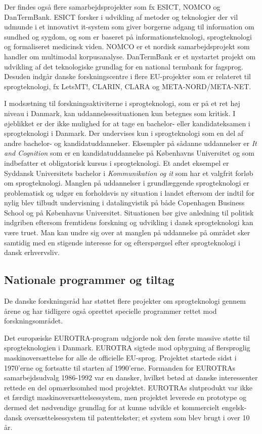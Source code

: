 \begin{multicols}{2}
Der findes \mbox{ogs\aa} flere samarbejdsprojekter som fx \mbox{ESICT}, NOMCO og DanTermBank. ESICT forsker i udvikling af metoder og teknologier der vil udmunde i et innovativt it-system som giver borgerne adgang til information om sundhed og sygdom, og som er baseret \mbox{p\aa} informationsteknologi, sprogteknologi og formali\-seret medicinsk viden. NOMCO er et nordisk samarbejdsprojekt som handler om multimodal korpusana\-lyse. DanTermBank er et nystartet projekt om udvikling af det teknologiske grundlag for en national termbank for fag\-sprog. Desuden indg\aa r danske forskningscentre i flere EU-projekter som er relateret til sprogtek\-nologi, fx LetsMT!, CLARIN, CLARA og META-NORD/META-NET.

I mods\ae tning til forskningsaktiviterne i sprogteknologi, som er \mbox{p\aa} et ret h\o j niveau i Danmark, kan uddannelsessituationen kun betegnes som kritisk. I \o jeblikket er der ikke mulighed for at tage en bachelor- eller kandidateksamen i sprogteknologi i Danmark.  Der undervises kun i sprogteknologi som en del af andre bachelor- og kandidatuddannelser. Eksempler \mbox{p\aa} s\aa danne uddannelser er {\it It and Cognition} som er en kandidatuddannelse \mbox{p\aa} K\o benhavns Universitet og som indbefatter et obligatorisk kursus i sprogteknologi. Et andet eksempel er Syddansk Universitets bachelor i {\it Kommunikation og it} som har et valgfrit forl\o b om sprogteknologi. Mang\-len \mbox{p\aa} uddannelser i grundl\ae ggende sprogteknologi er problematisk og udg\o r en forholdsvis ny situation i landet eftersom der indtil for nylig blev tilbudt undervisning i datalingvistik \mbox{p\aa} b\aa de Copenhagen Business School og \mbox{p\aa} K\o benhavns Universitet. Situationen b\o r give anledning til politisk indgriben eftersom fremtidens forskning og udvikling i dansk sprogteknologi kan v\ae re truet. Man kan undre sig over at manglen \mbox{p\aa} uddannelse \mbox{p\aa} omr\aa det sker samtidig med en stigende interesse for og eftersp\o rgsel efter sprogteknologi i dansk erhvervsliv.

\subsection{Nationale programmer og tiltag}

De danske forskningsr\aa d har st\o ttet flere projekter om sprogteknologi gennem \aa rene og har tidligere \mbox{ogs\aa} oprettet specielle programmer rettet mod forsknings\-omr\aa det.

Det europ\ae iske EUROTRA-program udgjorde nok den f\o rste massive st\o tte til sprogteknologien i Danmark.  EUROTRA sigtede mod opbygning af flersproglig maskinovers\ae ttelse for alle de officielle EU-sprog. Projektet startede sidst i 1970'erne og fortsatte til starten af 1990'erne. Formanden for EUROTRAs samarbejdsudvalg 1986-1992 var en dansker, hvilket bet\o d at danske interessenter rettede en del opm\ae rksomhed mod projektet. EUROTRAs slutprodukt var ikke et f\ae rdigt maskinovers\ae ttelsessystem, men projektet leverede en prototype og dermed det n\o dvendige grundlag for at kunne udvikle et kommercielt engelsk-dansk overs\ae ttelsessystem til patenttekster; et system som blev brugt i over 10 \aa r.  


\end{multicols}
